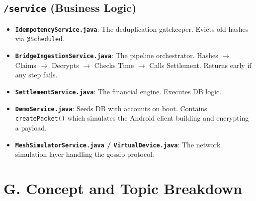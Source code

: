 \documentclass[11pt, a4paper]{article}
\begin{document}
\subsection*{\texttt{/service} (Business Logic)}
\begin{itemize}
    \item \textbf{\texttt{IdempotencyService.java}}: The deduplication gatekeeper. Evicts old hashes via \texttt{@Scheduled}.
    \item \textbf{\texttt{BridgeIngestionService.java}}: The pipeline orchestrator. Hashes $\rightarrow$ Claims $\rightarrow$ Decrypts $\rightarrow$ Checks Time $\rightarrow$ Calls Settlement. Returns early if any step fails.
    \item \textbf{\texttt{SettlementService.java}}: The financial engine. Executes DB logic.
    \item \textbf{\texttt{DemoService.java}}: Seeds DB with accounts on boot. Contains \texttt{createPacket()} which simulates the Android client building and encrypting a payload.
    \item \textbf{\texttt{MeshSimulatorService.java} / \texttt{VirtualDevice.java}}: The network simulation layer handling the gossip protocol.
\end{itemize}

\section*{G. Concept and Topic Breakdown}
\end{document}
